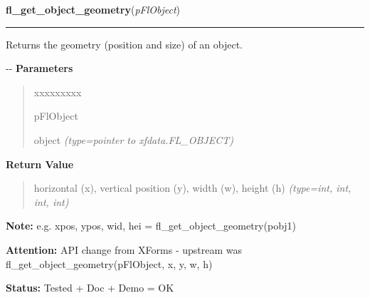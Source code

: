 \hspace{.8\funcindent}\begin{boxedminipage}{\funcwidth}

    \raggedright \textbf{fl\_get\_object\_geometry}(\textit{pFlObject})

    \vspace{-1.5ex}

    \rule{\textwidth}{0.5\fboxrule}
\setlength{\parskip}{2ex}

Returns the geometry (position and size) of an object.

-{}-
\setlength{\parskip}{1ex}
      \textbf{Parameters}
      \vspace{-1ex}

      \begin{quote}
        \begin{Ventry}{xxxxxxxxx}

          \item[pFlObject]


object
            {\it (type=pointer to xfdata.FL\_OBJECT)}

        \end{Ventry}

      \end{quote}

      \textbf{Return Value}
    \vspace{-1ex}

      \begin{quote}

horizontal (x), vertical position (y), width (w), height (h)
      {\it (type=int, int, int, int)}

      \end{quote}

\textbf{Note:} 
e.g. xpos, ypos, wid, hei = fl\_get\_object\_geometry(pobj1)


\textbf{Attention:} 
API change from XForms - upstream was
fl\_get\_object\_geometry(pFlObject, x, y, w, h)


\textbf{Status:} 
Tested + Doc + Demo = OK


    \end{boxedminipage}

    \label{xformslib:flbasic:fl_get_object_position}

    \vspace{0.5ex}

